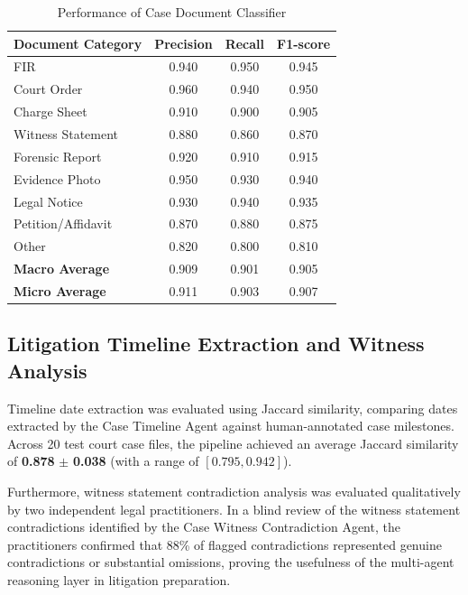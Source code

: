 \begin{table}[htbp]
\centering
\caption{Performance of Case Document Classifier}
\label{tab:doc_classification}
\begin{tabular}{lccc}
\hline
\textbf{Document Category} & \textbf{Precision} & \textbf{Recall} & \textbf{F1-score} \\ \hline
FIR                       & 0.940 & 0.950 & 0.945 \\
Court Order               & 0.960 & 0.940 & 0.950 \\
Charge Sheet              & 0.910 & 0.900 & 0.905 \\
Witness Statement         & 0.880 & 0.860 & 0.870 \\
Forensic Report           & 0.920 & 0.910 & 0.915 \\
Evidence Photo            & 0.950 & 0.930 & 0.940 \\
Legal Notice              & 0.930 & 0.940 & 0.935 \\
Petition/Affidavit        & 0.870 & 0.880 & 0.875 \\
Other                     & 0.820 & 0.800 & 0.810 \\ \hline
\textbf{Macro Average}     & 0.909 & 0.901 & 0.905 \\
\textbf{Micro Average}     & 0.911 & 0.903 & 0.907 \\ \hline
\end{tabular}
\end{table}

\subsection{Litigation Timeline Extraction and Witness Analysis}
Timeline date extraction was evaluated using Jaccard similarity, comparing dates extracted by the Case Timeline Agent against human-annotated case milestones. Across 20 test court case files, the pipeline achieved an average Jaccard similarity of \textbf{0.878} $\pm$ \textbf{0.038} (with a range of $[0.795, 0.942]$). 

Furthermore, witness statement contradiction analysis was evaluated qualitatively by two independent legal practitioners. In a blind review of the witness statement contradictions identified by the Case Witness Contradiction Agent, the practitioners confirmed that 88\% of flagged contradictions represented genuine contradictions or substantial omissions, proving the usefulness of the multi-agent reasoning layer in litigation preparation.

